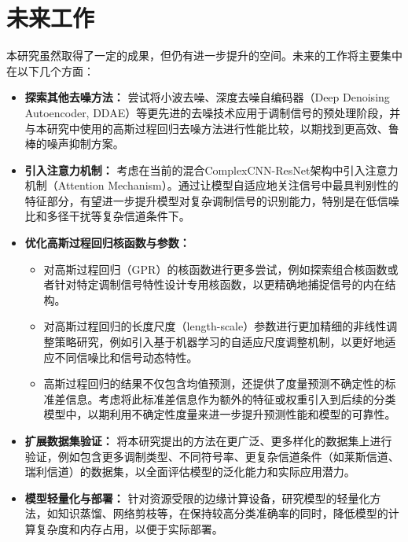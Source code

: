 \documentclass[conference]{IEEEtran}
\begin{document}
\section{未来工作}
本研究虽然取得了一定的成果，但仍有进一步提升的空间。未来的工作将主要集中在以下几个方面：

\begin{itemize}
    \item \textbf{探索其他去噪方法：} 尝试将小波去噪、深度去噪自编码器（Deep Denoising Autoencoder, DDAE）等更先进的去噪技术应用于调制信号的预处理阶段，并与本研究中使用的高斯过程回归去噪方法进行性能比较，以期找到更高效、鲁棒的噪声抑制方案。
    \item \textbf{引入注意力机制：} 考虑在当前的混合ComplexCNN-ResNet架构中引入注意力机制（Attention Mechanism）。通过让模型自适应地关注信号中最具判别性的特征部分，有望进一步提升模型对复杂调制信号的识别能力，特别是在低信噪比和多径干扰等复杂信道条件下。
    \item \textbf{优化高斯过程回归核函数与参数：}
    \begin{itemize}
        \item 对高斯过程回归（GPR）的核函数进行更多尝试，例如探索组合核函数或者针对特定调制信号特性设计专用核函数，以更精确地捕捉信号的内在结构。
        \item 对高斯过程回归的长度尺度（length-scale）参数进行更加精细的非线性调整策略研究，例如引入基于机器学习的自适应尺度调整机制，以更好地适应不同信噪比和信号动态特性。
        \item 高斯过程回归的结果不仅包含均值预测，还提供了度量预测不确定性的标准差信息。考虑将此标准差信息作为额外的特征或权重引入到后续的分类模型中，以期利用不确定性度量来进一步提升预测性能和模型的可靠性。
    \end{itemize}
    \item \textbf{扩展数据集验证：} 将本研究提出的方法在更广泛、更多样化的数据集上进行验证，例如包含更多调制类型、不同符号率、更复杂信道条件（如莱斯信道、瑞利信道）的数据集，以全面评估模型的泛化能力和实际应用潜力。
    \item \textbf{模型轻量化与部署：} 针对资源受限的边缘计算设备，研究模型的轻量化方法，如知识蒸馏、网络剪枝等，在保持较高分类准确率的同时，降低模型的计算复杂度和内存占用，以便于实际部署。
\end{itemize}
\end{document}
